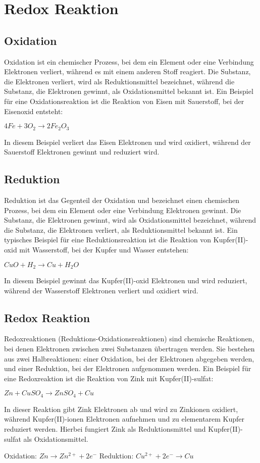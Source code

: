 
\section{Redox Reaktion}

\subsection{Oxidation} 
\label{sec:oxidation}
Oxidation ist ein chemischer Prozess, 
bei dem ein Element oder eine Verbindung Elektronen verliert, 
während es mit einem anderen Stoff reagiert. 
Die Substanz, die Elektronen verliert, wird als Reduktionsmittel bezeichnet, 
während die Substanz, die Elektronen gewinnt, als Oxidationsmittel bekannt ist. 
Ein Beispiel für eine Oxidationsreaktion ist die Reaktion von Eisen mit Sauerstoff, 
bei der Eisenoxid entsteht:

$4Fe + 3O_2 \rightarrow 2Fe_2O_3$

In diesem Beispiel verliert das Eisen Elektronen und wird oxidiert, 
während der Sauerstoff Elektronen gewinnt und reduziert wird.

\subsection{Reduktion}
\label{sec:reduktion}
Reduktion ist das Gegenteil der Oxidation und bezeichnet einen chemischen Prozess, 
bei dem ein Element oder eine Verbindung Elektronen gewinnt. 
Die Substanz, die Elektronen gewinnt, wird als Oxidationsmittel bezeichnet, 
während die Substanz, die Elektronen verliert, als Reduktionsmittel bekannt ist. 
Ein typisches Beispiel für eine Reduktionsreaktion ist die Reaktion von Kupfer(II)-oxid mit Wasserstoff, 
bei der Kupfer und Wasser entstehen:

$CuO + H_2 \rightarrow Cu + H_2O$

In diesem Beispiel gewinnt das Kupfer(II)-oxid Elektronen und wird reduziert, 
während der Wasserstoff Elektronen verliert und oxidiert wird.

\subsection{Redox Reaktion}
\label{sec:redox}
Redoxreaktionen (Reduktions-Oxidationsreaktionen) sind chemische Reaktionen, bei denen Elektronen zwischen zwei Substanzen übertragen werden. Sie bestehen aus zwei Halbreaktionen: einer Oxidation, bei der Elektronen abgegeben werden, und einer Reduktion, bei der Elektronen aufgenommen werden. Ein Beispiel für eine Redoxreaktion ist die Reaktion von Zink mit Kupfer(II)-sulfat:

$Zn + CuSO_4 \rightarrow ZnSO_4 + Cu$

In dieser Reaktion gibt Zink Elektronen ab und wird zu Zinkionen oxidiert, während Kupfer(II)-ionen Elektronen aufnehmen und zu elementarem Kupfer reduziert werden. Hierbei fungiert Zink als Reduktionsmittel und Kupfer(II)-sulfat als Oxidationsmittel.

Oxidation: $Zn \rightarrow Zn^{2+} + 2e^{-}$
Reduktion: $Cu^{2+} + 2e^{-} \rightarrow Cu$
